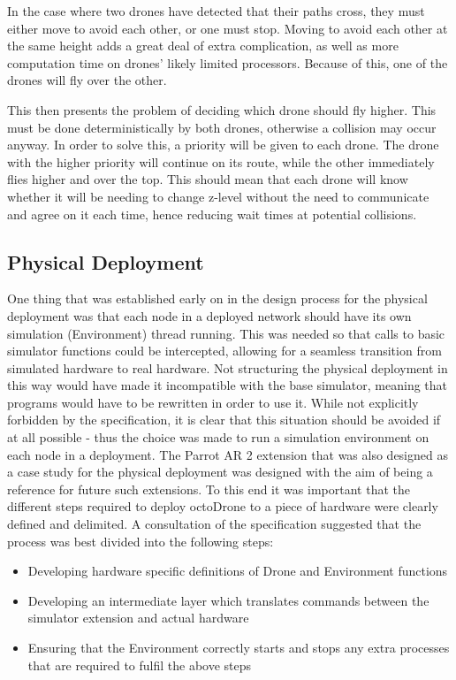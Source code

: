 In the case where two drones have detected that their paths cross, they must either move to avoid each other, or one must stop. Moving to avoid each other at the same height adds a great deal of extra complication, as well as more computation time on drones' likely limited processors. Because of this, one of the drones will fly over the other.

This then presents the problem of deciding which drone should fly higher. This must be done deterministically by both drones, otherwise a collision may occur anyway. In order to solve this, a priority will be given to each drone. The drone with the higher priority will continue on its route, while the other immediately flies higher and over the top. This should mean that each drone will know whether it will be needing to change z-level without the need to communicate and agree on it each time, hence reducing wait times at potential collisions.

\subsection{Physical Deployment}
One thing that was established early on in the design process for the physical deployment was that each node in a deployed network should have its own simulation (Environment) thread running. This was needed so that calls to basic simulator functions could be intercepted, allowing for a seamless transition from simulated hardware to real hardware. Not structuring the physical deployment in this way would have made it incompatible with the base simulator, meaning that programs would have to be rewritten in order to use it. While not explicitly forbidden by the specification, it is clear that this situation should be avoided if at all possible - thus the choice was made to run a simulation environment on each node in a deployment. The Parrot AR 2 extension that was also designed as a case study for the physical deployment was designed with the aim of being a reference for future such extensions. To this end it was important that the different steps required to deploy octoDrone to a piece of hardware were clearly defined and delimited. A consultation of the specification suggested that the process was best divided into the following steps:

\begin{itemize}
\item Developing hardware specific definitions of Drone and Environment functions
\item Developing an intermediate layer which translates commands between the simulator extension and actual hardware
\item Ensuring that the Environment correctly starts and stops any extra processes that are required to fulfil the above steps
\end{itemize}

